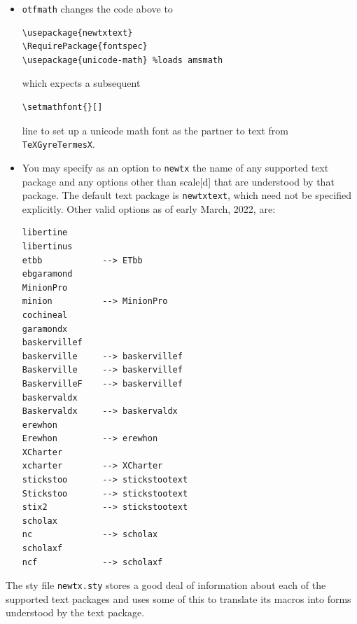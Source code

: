 \documentclass[\fsc]{article}
\theoremstyle{oldplain}
\theoremstyle{plain}
\begin{document}
\begin{itemize}
\item
{\tt otfmath} changes the code above to 
\begin{verbatim}
\usepackage{newtxtext}
\RequirePackage{fontspec}
\usepackage{unicode-math} %loads amsmath
\end{verbatim}
which expects a subsequent
\begin{verbatim}
\setmathfont{}[]
\end{verbatim}
line to set up a unicode math font as the partner to text from {\tt TeXGyreTermesX}.
\item You may specify as an option to {\tt newtx} the name of any supported text package and any options other than scale[d] that are understood by that package. The default text package is {\tt newtxtext}, which need not be specified explicitly. Other valid options as of early March, 2022, are:
\begin{verbatim}
libertine
libertinus
etbb			--> ETbb
ebgaramond
MinionPro
minion  		--> MinionPro
cochineal
garamondx
baskervillef
baskerville		--> baskervillef
Baskerville		--> baskervillef
BaskervilleF	--> baskervillef
baskervaldx
Baskervaldx		--> baskervaldx
erewhon
Erewhon			--> erewhon
XCharter
xcharter		--> XCharter
stickstoo		--> stickstootext
Stickstoo		--> stickstootext
stix2			--> stickstootext
scholax	
nc 				--> scholax
scholaxf
ncf				--> scholaxf
\end{verbatim}
\end{itemize}
The sty file {\tt newtx.sty} stores a good deal of information about each of the supported text packages and uses some of this to translate its macros into forms understood by the text package.
\end{document}
